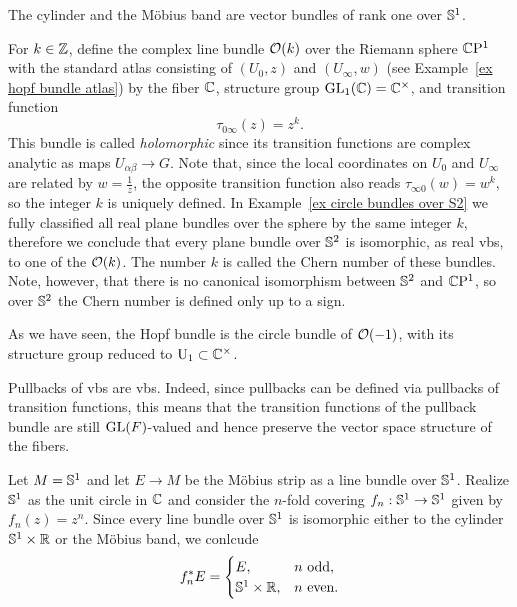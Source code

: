 \begin{example}
The cylinder and the M\"obius band are vector bundles of rank one over $\mathbb{S}^1$.
\end{example}

\begin{example}\label{ex holomorphic bundle O(k)}
    For $k\in\mathbb{Z}$, define the complex line bundle $\mathcal{O}(k)$ over the Riemann sphere $\mathbb{C}\mathrm{P}^1$ with the standard atlas consisting of $(U_0,z)$ and $(U_\infty,w)$ (see Example~\ref{ex hopf bundle atlas}) by the fiber $\mathbb{C}$, structure group $\operatorname{GL}_1(\mathbb{C})=\mathbb{C}^\times$, and transition function
    \[\tau_{0\infty}(z)=z^k.\]
    This bundle is called \emph{holomorphic} since its transition functions are complex analytic as maps $U_{\alpha\beta}\to G$.
    Note that, since the local coordinates on $U_0$ and $U_\infty$ are related by $w=\frac{1}{z}$, the opposite transition function also reads $\tau_{\infty 0}(w)=w^k$, so the integer $k$ is uniquely defined. In Example~\ref{ex circle bundles over S2} we fully classified all real plane bundles over the sphere by the same integer $k$, therefore we conclude that every plane bundle over $\mathbb{S}^2$ is isomorphic, as real \glspl{vb}, to one of the $\mathcal{O}(k)$. The number $k$ is called the Chern number of these bundles. Note, however, that there is no canonical isomorphism between $\mathbb{S}^2$ and $\mathbb{C}\mathrm{P}^1$, so over $\mathbb{S}^2$ the Chern number is defined only up to a sign.
    
    As we have seen, the Hopf bundle is the circle bundle of $\mathcal{O}(-1)$, with its structure group reduced to $\operatorname{U}_1\subset \mathbb{C}^\times$.
\end{example}


\begin{rem}
    Pullbacks of \glspl{vb} are \glspl{vb}. Indeed, since pullbacks can be defined via pullbacks of transition functions, this means that the transition functions of the pullback bundle are still $\operatorname{GL}(F)$-valued and hence preserve the vector space structure of the fibers.
\end{rem}


\begin{example}
    Let $M=\mathbb{S}^1$ and let $E\to M$ be the M\"obius strip as a line bundle over $\mathbb{S}^1$. Realize $\mathbb{S}^1$ as the unit circle in $\mathbb{C}$ and consider the $n$-fold covering $f_n:\mathbb{S}^1\to \mathbb{S}^1$ given by $f_n(z)=z^n$. Since every line bundle over $\mathbb{S}^1$ is isomorphic either to the cylinder $\mathbb{S}^1\times \mathbb{R}$ or the M\"obius band, we conlcude
    \[f_n^\ast E=\begin{cases}
        E,& n\text{ odd},\\
        \mathbb{S}^1\times\mathbb{R},& n\text{ even}.
    \end{cases}\]
\end{example}




